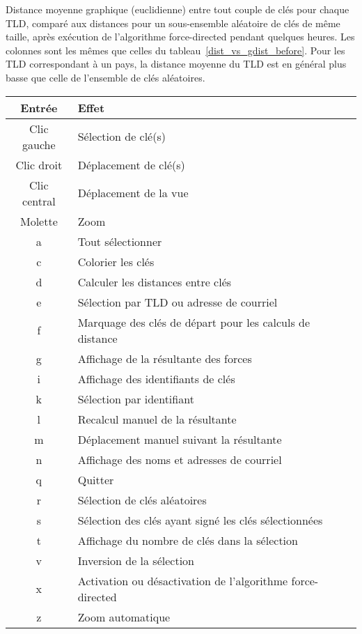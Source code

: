 \documentclass[a4paper]{article}
\newcommand{\tbl}[2]{
\begin{table}[p]
\centering

\caption{#2}
\label{#1}
\end{table}
}
\begin{document}
\tbl{dist_vs_gdist_after}{Distance moyenne graphique (euclidienne) entre tout couple de clés pour chaque TLD, comparé aux distances pour un sous-ensemble aléatoire de clés de même taille, après exécution de l'algorithme force-directed pendant quelques heures. Les colonnes sont les mêmes que celles du tableau~\ref{dist_vs_gdist_before}. Pour les TLD correspondant à un pays, la distance moyenne du TLD est en général plus basse que celle de l'ensemble de clés aléatoires.}

\begin{table}[p]
\centering
\begin{tabular}{|c|l|}
\hline {\bf Entrée} & {\bf Effet} \\
\hline Clic gauche & Sélection de clé(s) \\
\hline Clic droit & Déplacement de clé(s) \\
\hline Clic central & Déplacement de la vue \\
\hline Molette & Zoom \\
\hline a & Tout sélectionner \\
\hline c & Colorier les clés \\
\hline d & Calculer les distances entre clés \\
\hline e & Sélection par TLD ou adresse de courriel \\
\hline f & Marquage des clés de départ pour les calculs de distance \\
\hline g & Affichage de la résultante des forces \\
\hline i & Affichage des identifiants de clés \\
\hline k & Sélection par identifiant \\
\hline l & Recalcul manuel de la résultante \\
\hline m & Déplacement manuel suivant la résultante \\
\hline n & Affichage des noms et adresses de courriel \\
\hline q & Quitter \\
\hline r & Sélection de clés aléatoires \\
\hline s & Sélection des clés ayant signé les clés sélectionnées \\
\hline t & Affichage du nombre de clés dans la sélection \\
\hline v & Inversion de la sélection \\
\hline x & Activation ou désactivation de l'algorithme force-directed \\
\hline z & Zoom automatique \\

\end{tabular}
\end{table}
\end{document}
